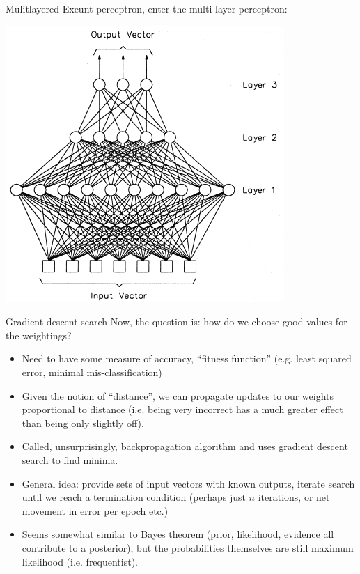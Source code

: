 \documentclass{beamer}
\begin{document}
\begin{frame}{Mulitlayered}
  Exeunt perceptron, enter the multi-layer perceptron:

  \begin{center}
    \includegraphics[scale=0.4]{multi}
  \end{center}

\end{frame}

\begin{frame}{Gradient descent search}
  Now, the question is: how do we choose good values for the
  weightings?

  \begin{itemize}
    \item Need to have some measure of accuracy, ``fitness function''
      (e.g. least squared error, minimal mis-classification)
    \item Given the notion of ``distance'', we can propagate updates
      to our weights proportional to distance (i.e. being very
      incorrect has a much greater effect than being only slightly
      off).
    \item Called, unsurprisingly, backpropagation algorithm and uses
      gradient descent search to find minima.
    \item General idea: provide sets of input vectors with known
      outputs, iterate search until we reach a termination condition
      (perhaps just $n$ iterations, or net movement in error per epoch
      etc.)
    \item Seems somewhat similar to Bayes theorem (prior, likelihood,
      evidence all contribute to a posterior), but the probabilities
      themselves are still maximum likelihood (i.e. frequentist).
  \end{itemize}
\end{frame}
\end{document}
